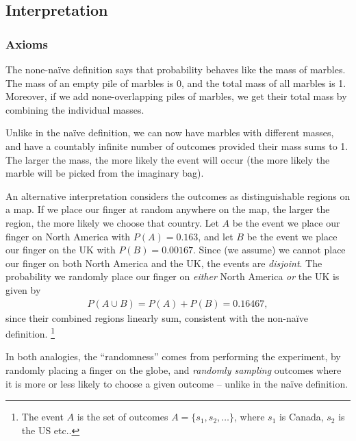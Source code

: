 \subsection{Interpretation}

\subsubsection{Axioms}

The none-naïve definition says that probability 
behaves like the mass of marbles. 
The mass of an empty pile of marbles is 0,
and the total mass of all marbles is 1. 
Moreover, 
if we add none-overlapping piles of marbles, 
we get their total mass by combining the individual masses. 

Unlike in the naïve definition, 
we can now have marbles with different masses, 
and have a countably infinite number of outcomes provided their mass sums to 1.
The larger the mass, 
the more likely the event will occur (the more likely the 
marble will be picked from the imaginary bag). 

An alternative interpretation considers the outcomes 
as distinguishable regions on a map. 
If we place our finger at random anywhere on the map, 
the larger the region, 
the more likely we choose that country.
Let \(A\) be the event we place our finger on 
North America with \(P(A)=0.163\),
and let \(B\) be the event we place our finger on 
the UK with \(P(B) = 0.00167\).
Since (we assume) we cannot place our 
finger on both North America and the UK, 
the events are \emph{disjoint}.
The probability we randomly place our finger on \emph{either} 
North America \emph{or} the UK is given by
\begin{align}
P(A \cup B) = P(A) + P(B) = 0.16467,
\end{align}
since their combined regions linearly sum,
consistent with the non-naïve definition.%
\footnote{%
The event \(A\) is the set of outcomes \(A = \{s_1, s_2, \ldots\}\), 
where \(s_1\) is Canada, 
\(s_2\) is the US etc..
}

In both analogies, 
the ``randomness'' comes from performing the experiment, 
by randomly placing a finger on the globe, 
and \emph{randomly sampling} outcomes where it is more or less likely to choose a given outcome -- unlike in the naïve definition.

